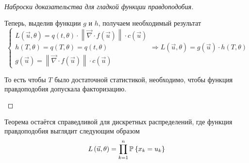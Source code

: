 \begin{proof}[Наброски доказательства для гладкой функции правдоподобия]
\begin{enumerate}
      Теперь, выделив функции $g$ и $h$, получаем необходимый результат
      $$\begin{cases}
      L\left( \vec{u}, \theta \right)
    = q\left( t, \theta \right)
        \cdot \left\| \vec{\nabla}
    \cdot f\left( \vec{u} \right) \right\|
    \cdot c\left( \vec{u} \right) \\
      h\left( T, \theta \right)
    = q\left( T, \theta \right)
    = q\left( t, \theta \right) \\
      g\left( \vec{u} \right)
    = \left\| \vec{\nabla}
    \cdot f\left( \vec{u} \right) \right\|
        \cdot c\left( \vec{u} \right)
      \end{cases}
      \Rightarrow
      L\left( \vec{u}, \theta \right)
    = g\left( \vec{u} \right) \cdot h\left( T, \theta \right)$$

     То есть чтобы $T$ было достаточной статистикой, необходимо, чтобы
     функция правдоподобия допускала факторизацию.
  \end{enumerate}
\end{proof}

\begin{remark}
  Теорема остаётся справедливой для дискретных распределений,
  где функция правдоподобия выглядит следующим образом
  $$L\left( \vec{u}, \theta \right) = \prod_{k=1}^n \mathbb{P}_{{}}\left\{ x_k = u_k \right\}$$
\end{remark}

